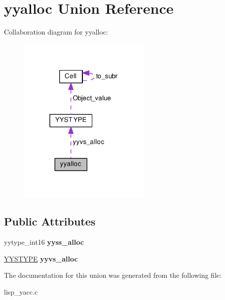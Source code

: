 \hypertarget{unionyyalloc}{\section{yyalloc Union Reference}
\label{unionyyalloc}
}


Collaboration diagram for yyalloc\-:\nopagebreak
\begin{figure}[H]
\begin{center}
\leavevmode
\includegraphics[width=184pt]{unionyyalloc__coll__graph}
\end{center}
\end{figure}
\subsection*{Public Attributes}
\begin{DoxyCompactItemize}
\item 
\hypertarget{unionyyalloc_a4800e0520a89a4789afa7b5d82197e65}{yytype\-\_\-int16 {\bfseries yyss\-\_\-alloc}}\label{unionyyalloc_a4800e0520a89a4789afa7b5d82197e65}

\item 
\hypertarget{unionyyalloc_a9326f4fdc6f737a929444427836d8928}{\hyperlink{unionYYSTYPE}{Y\-Y\-S\-T\-Y\-P\-E} {\bfseries yyvs\-\_\-alloc}}\label{unionyyalloc_a9326f4fdc6f737a929444427836d8928}

\end{DoxyCompactItemize}


The documentation for this union was generated from the following file\-:\begin{DoxyCompactItemize}
\item 
lisp\-\_\-yacc.\-c\end{DoxyCompactItemize}
